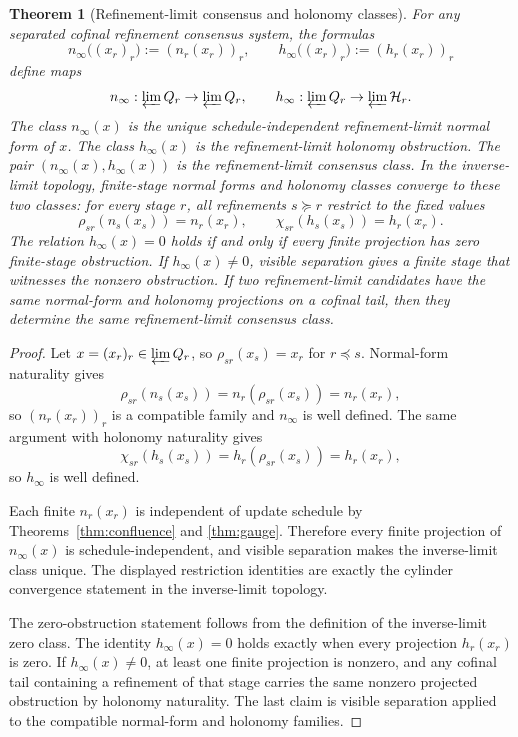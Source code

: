 \documentclass[11pt]{article}
\newtheorem{theorem}{Theorem}[section]
\theoremstyle{remark}
\theoremstyle{plain}
\begin{document}
\begin{theorem}[Refinement-limit consensus and holonomy classes]\label{thm:refinement-consensus}
For any separated cofinal refinement consensus system, the formulas
\[
n_\infty\bigl((x_r)_r\bigr):=(n_r(x_r))_r,
\qquad
h_\infty\bigl((x_r)_r\bigr):=(h_r(x_r))_r
\]
define maps
\[
n_\infty:\varprojlim Q_r\to\varprojlim Q_r,
\qquad
h_\infty:\varprojlim Q_r\to\varprojlim\mathcal H_r.
\]
The class \(n_\infty(x)\) is the unique schedule-independent refinement-limit normal form of
\(x\). The class \(h_\infty(x)\) is the refinement-limit holonomy obstruction. The pair
\((n_\infty(x),h_\infty(x))\) is the refinement-limit consensus class. In the inverse-limit
topology, finite-stage normal forms and holonomy classes converge to these two classes: for every
stage \(r\), all refinements \(s\succeq r\) restrict to the fixed values
\[
\rho_{sr}(n_s(x_s))=n_r(x_r),
\qquad
\chi_{sr}(h_s(x_s))=h_r(x_r).
\]
The relation \(h_\infty(x)=0\) holds if and only if every finite projection has zero finite-stage
obstruction. If \(h_\infty(x)\ne0\), visible separation gives a finite stage that witnesses the
nonzero obstruction. If two refinement-limit candidates have the same normal-form and holonomy
projections on a cofinal tail, then they determine the same refinement-limit consensus class.
\end{theorem}

\begin{proof}
Let \(x=(x_r)_r\in\varprojlim Q_r\), so \(\rho_{sr}(x_s)=x_r\) for \(r\preceq s\). Normal-form
naturality gives
\[
\rho_{sr}(n_s(x_s))
=
n_r(\rho_{sr}(x_s))
=
n_r(x_r),
\]
so \((n_r(x_r))_r\) is a compatible family and \(n_\infty\) is well defined. The same argument
with holonomy naturality gives
\[
\chi_{sr}(h_s(x_s))
=
h_r(\rho_{sr}(x_s))
=
h_r(x_r),
\]
so \(h_\infty\) is well defined.

Each finite \(n_r(x_r)\) is independent of update schedule by Theorems~\ref{thm:confluence} and
\ref{thm:gauge}. Therefore every finite projection of \(n_\infty(x)\) is schedule-independent,
and visible separation makes the inverse-limit class unique. The displayed restriction identities
are exactly the cylinder convergence statement in the inverse-limit topology.

The zero-obstruction statement follows from the definition of the inverse-limit zero class. The
identity \(h_\infty(x)=0\) holds exactly when every projection \(h_r(x_r)\) is zero. If
\(h_\infty(x)\ne0\), at least one finite projection is nonzero, and any cofinal tail containing a
refinement of that stage carries the same nonzero projected obstruction by holonomy naturality.
The last claim is visible separation applied to the compatible normal-form and holonomy families.
\end{proof}
\end{document}

